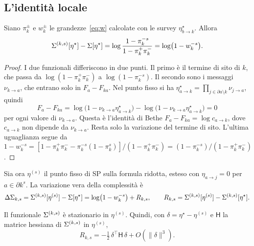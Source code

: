 \subsection{L'identità locale}

\begin{proposizione}
\label{prop:local}
Siano $\pi_k^{\pm}$ e $w_k^{\pm}$ le grandezze~\eqref{eq:w} calcolate con le survey $\eta^\star_{b\to k}$.
Allora
\begin{equation}
\Sigma^{(k,s)}[\eta^\star]-\Sigma[\eta^\star]=\log\frac{1-\pi_k^{-s}}{1-\pi_k^+\pi_k^-}=\log\bigl(1-w_k^{-s}\bigr).
\label{eq:local-identity}
\end{equation}
\end{proposizione}

\begin{proof}
I due funzionali differiscono in due punti.
Il primo è il termine di sito di $k$, che passa da $\log(1-\pi_k^+\pi_k^-)$ a $\log(1-\pi_k^{-s})$.
Il secondo sono i messaggi $\nu_{k\to a}$, che entrano solo in $F_a-F_{ka}$.
Nel punto fisso si ha $\eta^\star_{a\to k}=\prod_{j\in\partial a\setminus k}\nu_{j\to a}$, quindi
\begin{equation*}
F_a-F_{ka}=\log\bigl(1-\nu_{k\to a}\eta^\star_{a\to k}\bigr)-\log\bigl(1-\nu_{k\to a}\eta^\star_{a\to k}\bigr)=0
\end{equation*}
per ogni valore di $\nu_{k\to a}$.
Questa è l'identità di Bethe $F_a-F_{ka}=\log c_{a\to k}$, dove $c_{a\to k}$ non dipende da $\nu_{k\to a}$.
Resta solo la variazione del termine di sito.
L'ultima uguaglianza segue da $1-w_k^{-s}=[1-\pi_k^+\pi_k^--\pi_k^{-s}(1-\pi_k^{s})]/(1-\pi_k^+\pi_k^-)=(1-\pi_k^{-s})/(1-\pi_k^+\pi_k^-)$.
\end{proof}

Sia ora $\eta^{(s)}$ il punto fisso di SP sulla formula ridotta, esteso con $\eta_{a\to j}=0$ per $a\in\partial k^{s}$.
La variazione vera della complessità è
\begin{equation}
\Delta\Sigma_{k,s}=\Sigma^{(k,s)}[\eta^{(s)}]-\Sigma[\eta^\star]=\log\bigl(1-w_k^{-s}\bigr)+R_{k,s},
\qquad R_{k,s}=\Sigma^{(k,s)}[\eta^{(s)}]-\Sigma^{(k,s)}[\eta^\star].
\label{eq:true-change}
\end{equation}

\begin{proposizione}
\label{prop:remainder}
Il funzionale $\Sigma^{(k,s)}$ è stazionario in $\eta^{(s)}$.
Quindi, con $\delta=\eta^\star-\eta^{(s)}$ e $\mathsf H$ la matrice hessiana di $\Sigma^{(k,s)}$ in $\eta^{(s)}$,
\begin{equation}
R_{k,s}=-\tfrac12\,\delta^{\top}\mathsf H\,\delta+O(\|\delta\|^3).
\label{eq:remainder}
\end{equation}
\end{proposizione}

